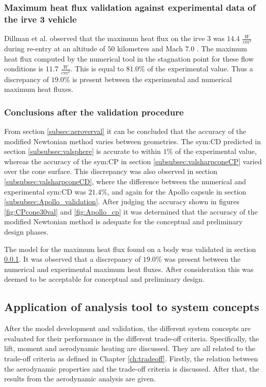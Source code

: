 \subsubsection{Maximum heat flux validation against experimental data of the \gls{irve} 3 vehicle}
\label{subsubsec:heatvalidation}
Dillman et al. observed that the maximum heat flux on the \acrfull{irve} 3 was $14.4$ $\frac{W}{cm^{2}}$ during re-entry at an altitude of $50$ kilometres and Mach $7.0$ \cite{Dillman2012}. The maximum heat flux computed by the numerical tool in the stagnation point for these flow conditions is $11.7$ $\frac{W}{cm^{2}}$. This is equal to $81.0\%$ of the experimental value. Thus a discrepancy of $19.0\%$ is present between the experimental and numerical maximum heat fluxes.

\subsubsection{Conclusions after the validation procedure}
\label{subsec:validconclusions}

From section \ref{subsec:aeroverval} it can be concluded that the accuracy of the modified Newtonian method varies between geometries. The \gls{sym:CD} predicted in section \ref{subsubsec:valsphere} is accurate to within $1\%$ of the experimental value, whereas the accuracy of the \gls{sym:CP} in section \ref{subsubsec:valsharpconeCP} varied over the cone surface. This discrepancy was also observed in section \ref{subsubsec:valsharpconeCD}, where the difference between the numerical and experimental \gls{sym:CD} was $21.4\%$, and again for the Apollo capsule in section \ref{subsubsec:Apollo_validation}. After judging the accuracy shown in figures \ref{fig:CPcone30val} and \ref{fig:Apollo_cp} it was determined that the accuracy of the modified Newtonian method is adequate for the conceptual and preliminary design phases.

The model for the maximum heat flux found on a body was validated in section \ref{subsubsec:heatvalidation}. It was observed that a discrepancy of $19.0\%$ was present between the numerical and experimental maximum heat fluxes. After consideration this was deemed to be acceptable for conceptual and preliminary design.

\subsection{Application of analysis tool to system concepts}
\label{subsec:appaeroanal}
After the model development and validation, the different system concepts are evaluated for their performance in the different trade-off criteria. Specifically, the lift, moment and aerodynamic heating are discussed. They are all related to the trade-off criteria as defined in Chapter \ref{ch:tradeoff}. Firstly, the relation between the aerodynamic properties and the trade-off criteria is discussed. After that, the results from the aerodynamic analysis are given.

